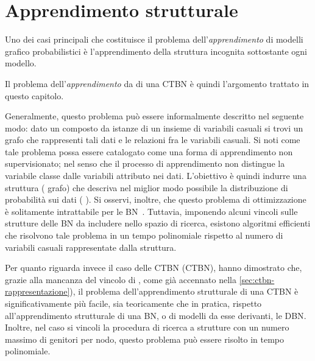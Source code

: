 
\chapter{Apprendimento strutturale}\label{cap:structurallearning}
Uno dei casi principali che costituisce il problema dell'\emph{apprendimento} di modelli grafico probabilistici è l'apprendimento della struttura incognita sottostante ogni modello.

Il problema dell'\emph{apprendimento } da \emph{} di una \acs{CTBN} è quindi l'argomento trattato in questo capitolo.

Generalmente, questo problema può essere informalmente descritto nel seguente modo: dato un  composto da istanze di un insieme di variabili casuali si trovi un grafo che rappresenti tali dati e le relazioni fra le variabili casuali. Si noti come tale problema possa essere catalogato come una forma di apprendimento non supervisionato; nel senso che il processo di apprendimento non distingue la variabile classe dalle variabili attributo nei dati. L'obiettivo è quindi indurre una struttura (\ie{} grafo) che descriva nel miglior modo possibile la distribuzione di probabilità sui dati (\ie{} \emph{}). Si osservi, inoltre, che questo problema di ottimizzazione è solitamente intrattabile per le \acl{BN}~\citep{Chickering1994}. Tuttavia, imponendo alcuni vincoli sulle strutture delle \acs{BN} da includere nello spazio di ricerca, esistono algoritmi efficienti che risolvono tale problema in un tempo polinomiale rispetto al numero di variabili casuali rappresentate dalla struttura.

Per quanto riguarda invece il caso delle \acl{CTBN} (\acs{CTBN}), \citet{Nodelman2002} hanno dimostrato che, grazie alla mancanza del vincolo di , come già accennato nella \autoref{sec:ctbn-rappresentazione}), il problema dell'apprendimento strutturale di una \acs{CTBN} è significativamente più facile, sia teoricamente che in pratica, rispetto all'apprendimento strutturale di una \acl{BN}, o di modelli da esse derivanti, \eg{} le \acf{DBN}. Inoltre, nel caso si vincoli la procedura di ricerca a strutture con un numero massimo di genitori per nodo, questo problema può essere risolto in tempo polinomiale.

